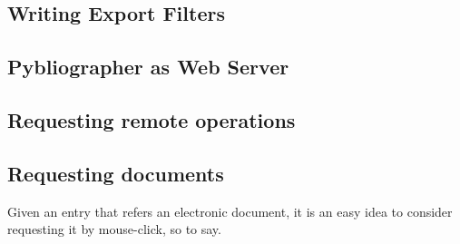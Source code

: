 
  





\subsection{Writing Export Filters}
\label{sec:exportfilter}


\subsection{Pybliographer as Web Server }
\label{sec:pybweb}


\subsection{Requesting remote operations}
\label{sec:remotereq}


\subsection{Requesting documents}
\label{sec:docrequest}

Given an entry that refers an electronic document, it is an easy idea
to consider requesting it by mouse-click, so to say.



